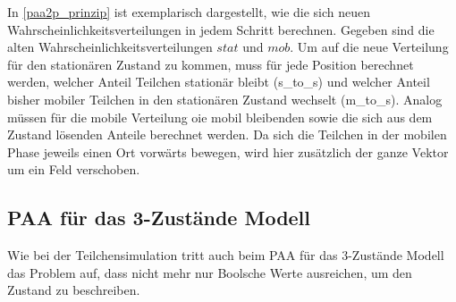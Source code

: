 In \ref{paa2p_prinzip} ist exemplarisch dargestellt, wie die sich neuen Wahrscheinlichkeitsverteilungen in jedem Schritt berechnen. 
Gegeben sind die alten Wahrscheinlichkeitsverteilungen $stat$ und $mob$.
Um auf die neue Verteilung für den stationären Zustand zu kommen, muss für jede Position berechnet werden, welcher Anteil Teilchen stationär bleibt (s\_to\_s) und welcher Anteil bisher mobiler Teilchen in den stationären Zustand wechselt (m\_to\_s).
Analog müssen für die mobile Verteilung oie mobil bleibenden sowie die sich aus dem Zustand lösenden Anteile berechnet werden. Da sich die Teilchen in der mobilen Phase jeweils einen Ort vorwärts bewegen, wird hier zusätzlich der ganze Vektor um ein Feld verschoben. 

\subsection{PAA für das 3-Zustände Modell}
Wie bei der Teilchensimulation tritt auch beim PAA für das 3-Zustände Modell das Problem auf, dass nicht mehr nur Boolsche Werte  ausreichen, um den Zustand zu beschreiben. 
